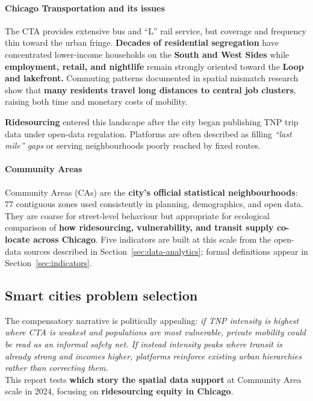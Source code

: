 \documentclass[10pt, a4paper]{article}
\begin{document}
    \paragraph{Chicago Transportation and its issues} The CTA provides extensive bus and ``L'' rail service, but coverage and frequency thin toward the urban fringe. \textbf{Decades of residential segregation} have concentrated lower-income households on the \textbf{South and West Sides} while \textbf{employment, retail, and nightlife} remain strongly oriented toward the \textbf{Loop and lakefront.} Commuting patterns documented in spatial mismatch research \cite{kwan1998} show that \textbf{many residents travel long distances to central job clusters}, raising both time and monetary costs of mobility.

    \textbf{Ridesourcing} entered this landscape after the city began publishing TNP trip data under open-data regulation. Platforms are often described as filling \textit{``last mile'' gaps} or serving neighbourhoods poorly reached by fixed routes.

    \paragraph{Community Areas} Community Areas (CAs) are the \textbf{city's official statistical neighbourhoods}: 77 contiguous zones used consistently in planning, demographics, and open data. They are coarse for street-level behaviour but appropriate for ecological comparison of \textbf{how ridesourcing, vulnerability, and transit supply co-locate across Chicago}. Five indicators are built at this scale from the open-data sources described in Section~\ref{sec:data-analytics}; formal definitions appear in Section~\ref{sec:indicators}.

\subsection{Smart cities problem selection}
    The compensatory narrative is politically appealing: \emph{if TNP intensity is highest where CTA is weakest and populations are most vulnerable, private mobility could be read as an informal safety net. If instead intensity peaks where transit is already strong and incomes higher, platforms reinforce existing urban hierarchies rather than correcting them.}\\

    This report tests \textbf{which story the spatial data support} at Community Area scale in 2024, focusing on \textbf{ridesourcing equity in Chicago}.
\end{document}
